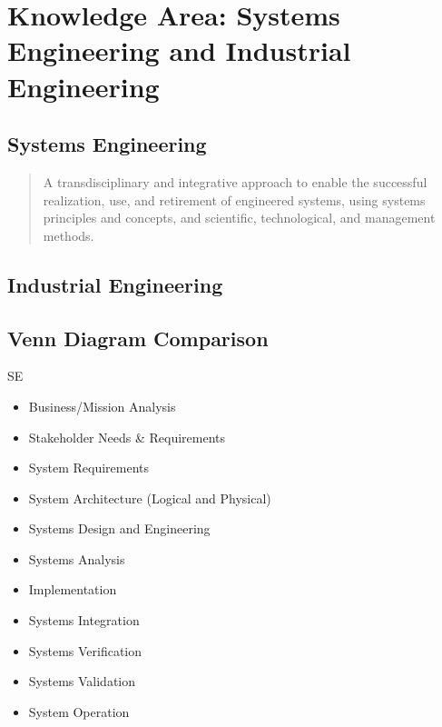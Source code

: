 \documentclass[letterpaper,10pt,english]{jupyterBook}
\begin{document}
\section{Knowledge Area: Systems Engineering and Industrial Engineering}
\label{\detokenize{SE/sebok:knowledge-area-systems-engineering-and-industrial-engineering}}

\subsection{Systems Engineering}
\label{\detokenize{SE/sebok:systems-engineering}}\begin{quote}

\sphinxAtStartPar
A transdisciplinary and integrative approach to enable the successful realization, use, and retirement of engineered systems, using systems principles and concepts, and scientific, technological, and management methods.
\end{quote}


\subsection{Industrial Engineering}
\label{\detokenize{SE/sebok:industrial-engineering}}

\subsection{Venn Diagram Comparison}
\label{\detokenize{SE/sebok:venn-diagram-comparison}}
\sphinxAtStartPar
SE
\begin{itemize}
\item {} 
\sphinxAtStartPar
Business/Mission Analysis

\item {} 
\sphinxAtStartPar
Stakeholder Needs \& Requirements

\item {} 
\sphinxAtStartPar
System Requirements

\item {} 
\sphinxAtStartPar
System Architecture (Logical and Physical)

\item {} 
\sphinxAtStartPar
Systems Design and Engineering

\item {} 
\sphinxAtStartPar
Systems Analysis

\item {} 
\sphinxAtStartPar
Implementation

\item {} 
\sphinxAtStartPar
Systems Integration

\item {} 
\sphinxAtStartPar
Systems Verification

\item {} 
\sphinxAtStartPar
Systems Validation

\item {} 
\sphinxAtStartPar
System Operation

\end{itemize}
\end{document}
